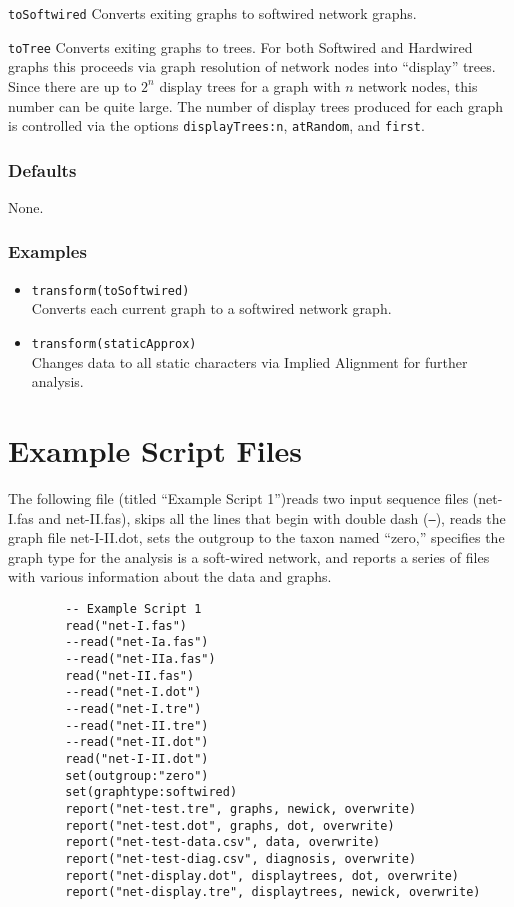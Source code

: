 \documentclass[11pt]{article}
\begin{document}
			\smallskip		
			\noindent \texttt{toSoftwired} Converts exiting graphs to softwired network graphs.
			
			\smallskip		
			\noindent \texttt{toTree} Converts exiting graphs to trees.  For both Softwired and Hardwired graphs this proceeds via graph resolution of network nodes into ``display'' trees.  
			Since there are up to $2^n$ display trees for a graph with $n$ network nodes, this number can be quite large.  The number of display trees produced for each graph
			is controlled via the options \texttt{displayTrees:n}, \texttt{atRandom}, and \texttt{first}. 
			
			\smallskip		
			
		\subsubsection{Defaults}
			None.
			
		\subsubsection{Examples}
			\begin{itemize}
				\item{\texttt{transform(toSoftwired)}\\Converts each current graph to a softwired network graph.}
				\item{\texttt{transform(staticApprox)}\\Changes data to all static characters via Implied Alignment for further analysis.}
				
			\end{itemize}
	

	\section{Example Script Files}
	The following file (titled ``Example Script 1'')reads two input sequence files (net-I.fas and net-II.fas), skips all the lines that begin with double dash (\texttt{--}),
	reads the graph file net-I-II.dot, sets the outgroup to the taxon named ``zero,'' specifies the graph type for the analysis is a soft-wired network, and
	reports a series of files with various information about the data and graphs.
	\begin{verbatim}
		-- Example Script 1
		read("net-I.fas")
		--read("net-Ia.fas")
		--read("net-IIa.fas")
		read("net-II.fas")
		--read("net-I.dot")
		--read("net-I.tre")
		--read("net-II.tre")
		--read("net-II.dot")
		read("net-I-II.dot")
		set(outgroup:"zero")
		set(graphtype:softwired)
		report("net-test.tre", graphs, newick, overwrite)
		report("net-test.dot", graphs, dot, overwrite)
		report("net-test-data.csv", data, overwrite)
		report("net-test-diag.csv", diagnosis, overwrite)
		report("net-display.dot", displaytrees, dot, overwrite)
		report("net-display.tre", displaytrees, newick, overwrite)
		
	\end{verbatim}
	
\end{document}
